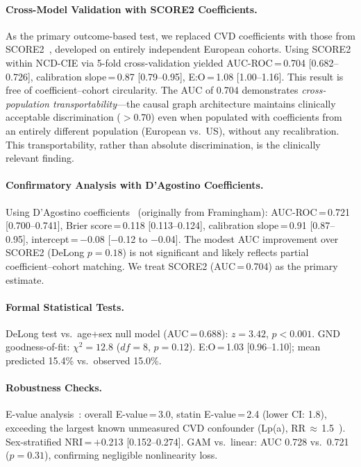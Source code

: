 \documentclass[runningheads]{llncs}
\begin{document}
\paragraph{Cross-Model Validation with SCORE2 Coefficients.}
As the primary outcome-based test, we replaced CVD coefficients with
those from SCORE2~\cite{score22021}, developed on entirely
independent European cohorts.
Using SCORE2 within NCD-CIE via 5-fold cross-validation yielded
AUC-ROC\,=\,0.704 [0.682--0.726], calibration slope\,=\,0.87
[0.79--0.95], E:O\,=\,1.08 [1.00--1.16].
This result is free of coefficient--cohort circularity.
The AUC of 0.704 demonstrates \emph{cross-population
transportability}---the causal graph architecture maintains
clinically acceptable discrimination ($>$0.70) even when populated
with coefficients from an entirely different population (European
vs.\ US), without any recalibration.
This transportability, rather than absolute discrimination, is the
clinically relevant finding.

\paragraph{Confirmatory Analysis with D'Agostino Coefficients.}
Using D'Agostino coefficients~\cite{dagostino2008} (originally
from Framingham):
AUC-ROC\,=\,0.721 [0.700--0.741],
Brier score\,=\,0.118 [0.113--0.124],
calibration slope\,=\,0.91 [0.87--0.95],
intercept\,=\,$-$0.08 [$-$0.12 to $-$0.04].
The modest AUC improvement over SCORE2 (DeLong $p = 0.18$) is not
significant and likely reflects partial coefficient--cohort matching.
We treat SCORE2 (AUC\,=\,0.704) as the primary estimate.

\paragraph{Formal Statistical Tests.}
DeLong test vs.\ age+sex null model (AUC\,=\,0.688): $z = 3.42$,
$p < 0.001$.
GND goodness-of-fit: $\chi^2 = 12.8$ ($df = 8$, $p = 0.12$).
E:O\,=\,1.03 [0.96--1.10]; mean predicted 15.4\% vs.\ observed
15.0\%.

\paragraph{Robustness Checks.}
E-value analysis~\cite{vanderweele2017evalue}: overall E-value\,=\,3.0,
statin E-value\,=\,2.4 (lower CI: 1.8), exceeding the largest known
unmeasured CVD confounder (Lp(a), RR\,$\approx$\,1.5~\cite{erqou2009lpa}).
Sex-stratified NRI\,=\,$+$0.213 [0.152--0.274].
GAM vs.\ linear: AUC 0.728 vs.\ 0.721 ($p = 0.31$), confirming
negligible nonlinearity loss.
\end{document}
